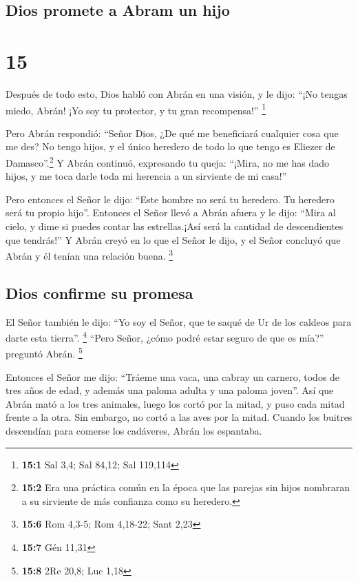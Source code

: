 \hypertarget{dios-promete-a-abram-un-hijo}{%
\subsection{Dios promete a Abram un
hijo}\label{dios-promete-a-abram-un-hijo}}

\hypertarget{section-14}{%
\section{15}\label{section-14}}

 Después de todo esto, Dios habló con Abrán en una visión,
y le dijo: ``¡No tengas miedo, Abrán! ¡Yo soy tu protector, y tu gran
recompensa!'' \footnote{\textbf{15:1} Sal 3,4; Sal 84,12; Sal 119,114}

 Pero Abrán respondió: ``Señor Dios, ¿De qué me
beneficiará cualquier cosa que me des? No tengo hijos, y el único
heredero de todo lo que tengo es Eliezer de Damasco''.\footnote{\textbf{15:2}
  Era una práctica común en la época que las parejas sin hijos nombraran
  a su sirviente de más confianza como su heredero.}  Y
Abrán continuó, expresando tu queja: ``¡Mira, no me has dado hijos, y me
toca darle toda mi herencia a un sirviente de mi casa!''

 Pero entonces el Señor le dijo: ``Este hombre no será tu
heredero. Tu heredero será tu propio hijo''.  Entonces el
Señor llevó a Abrán afuera y le dijo: ``Mira al cielo, y dime si puedes
contar las estrellas.¡Así será la cantidad de descendientes que
tendrás!''  Y Abrán creyó en lo que el Señor le dijo, y el
Señor concluyó que Abrán y él tenían una relación buena. \footnote{\textbf{15:6}
  Rom 4,3-5; Rom 4,18-22; Sant 2,23}

\hypertarget{dios-confirme-su-promesa}{%
\subsection{Dios confirme su promesa}\label{dios-confirme-su-promesa}}

 El Señor también le dijo: ``Yo soy el Señor, que te saqué
de Ur de los caldeos para darte esta tierra''. \footnote{\textbf{15:7}
  Gén 11,31}  ``Pero Señor, ¿cómo podré estar seguro de
que es mía?'' preguntó Abrán. \footnote{\textbf{15:8} 2Re 20,8; Luc 1,18}

 Entonces el Señor me dijo: ``Tráeme una vaca, una cabray
un carnero, todos de tres años de edad, y además una paloma adulta y una
paloma joven''.  Así que Abrán mató a los tres animales,
luego los cortó por la mitad, y puso cada mitad frente a la otra. Sin
embargo, no cortó a las aves por la mitad.  Cuando los
buitres descendían para comerse los cadáveres, Abrán los espantaba.

